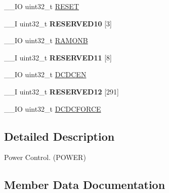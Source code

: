 \begin{DoxyCompactItemize}
\item 
\+\_\+\+\_\+\+I\+O uint32\+\_\+t \hyperlink{struct_n_r_f___p_o_w_e_r___type_aa16ae60aa345ff037ae82fbafd475101}{R\+E\+S\+E\+T}
\item 
\hypertarget{struct_n_r_f___p_o_w_e_r___type_afacf3d11efc070e455469af87d68c270}{}\+\_\+\+\_\+\+I uint32\+\_\+t {\bfseries R\+E\+S\+E\+R\+V\+E\+D10} \mbox{[}3\mbox{]}\label{struct_n_r_f___p_o_w_e_r___type_afacf3d11efc070e455469af87d68c270}

\item 
\+\_\+\+\_\+\+I\+O uint32\+\_\+t \hyperlink{struct_n_r_f___p_o_w_e_r___type_a0a86b8f34c1a19d957582fe66ae49b79}{R\+A\+M\+O\+N\+B}
\item 
\hypertarget{struct_n_r_f___p_o_w_e_r___type_a0d70ac30d7142487bcdc9a28aecd1c98}{}\+\_\+\+\_\+\+I uint32\+\_\+t {\bfseries R\+E\+S\+E\+R\+V\+E\+D11} \mbox{[}8\mbox{]}\label{struct_n_r_f___p_o_w_e_r___type_a0d70ac30d7142487bcdc9a28aecd1c98}

\item 
\+\_\+\+\_\+\+I\+O uint32\+\_\+t \hyperlink{struct_n_r_f___p_o_w_e_r___type_a5b0a7e0a02a6912516584852231bef41}{D\+C\+D\+C\+E\+N}
\item 
\hypertarget{struct_n_r_f___p_o_w_e_r___type_a9ae5ec92cc5d960cfe9df349473fb3bc}{}\+\_\+\+\_\+\+I uint32\+\_\+t {\bfseries R\+E\+S\+E\+R\+V\+E\+D12} \mbox{[}291\mbox{]}\label{struct_n_r_f___p_o_w_e_r___type_a9ae5ec92cc5d960cfe9df349473fb3bc}

\item 
\+\_\+\+\_\+\+I\+O uint32\+\_\+t \hyperlink{struct_n_r_f___p_o_w_e_r___type_aa4e6685e8c7674cbc4aae005dfb92217}{D\+C\+D\+C\+F\+O\+R\+C\+E}
\end{DoxyCompactItemize}


\subsection{Detailed Description}
Power Control. (P\+O\+W\+E\+R) 

\subsection{Member Data Documentation}
\hypertarget{struct_n_r_f___p_o_w_e_r___type_a5b0a7e0a02a6912516584852231bef41}{}
